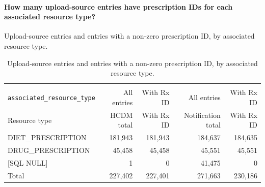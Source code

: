 \paragraph{How many upload-source entries have prescription IDs for each associated resource type?}
Upload-source entries and entries with a non-zero prescription ID, by associated resource type.

\begin{longtable}{@{}lrrrr@{}}
\caption{Upload-source entries and entries with a non-zero prescription ID, by associated resource type.}
\label{tab:upload-source-resource-types}\\
\toprule
 &  &  \\
\cmidrule(lr){2-3}\cmidrule(lr){4-5}
\texttt{associated\_resource\_type} & All entries & With Rx ID & All entries & With Rx ID \\
\midrule
\endfirsthead
\toprule Resource type & HCDM total & With Rx ID & Notification total & With Rx ID \\
\midrule
\endhead

{DIET\_PRESCRIPTION} & 181,943 & 181,943 & 184,637 & 184,635 \\

{DRUG\_PRESCRIPTION} & 45,458 & 45,458 & 45,551 & 45,551 \\

{[SQL NULL]} & 1 & 0 & 41,475 & 0 \\
\midrule
{Total} & 227,402 & 227,401 & 271,663 & 230,186 \\
\bottomrule
\end{longtable}
